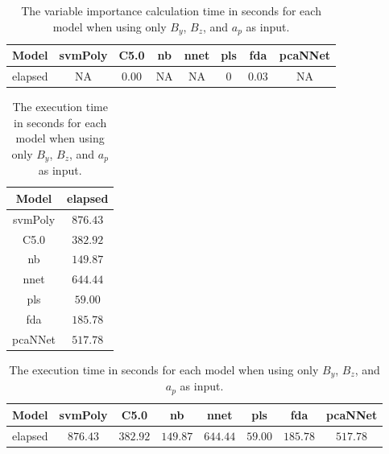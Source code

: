 \begin{table}[!ht]
	\centering
	\begin{tabular}{|c|c|c|c|c|c|c|c|}
		\hline
		Model & svmPoly & C5.0 & nb & nnet & pls & fda & pcaNNet \\ \hline
		elapsed & NA & $0.00$ & NA & NA & $0$ & $0.03$ & NA \\ \hline
	\end{tabular}
	\caption{The variable importance calculation time in seconds for each model when using only $B_{y}$, $B_{z}$, and $a_{p}$ as input.}
	\label{tab:time:reverse:yzap:importance}
\end{table}

\begin{table}[!ht]
	\centering
	\begin{tabular}{|c|c|}
		\hline
		Model & elapsed \\ \hline
		svmPoly & $876.43$ \\ \hline
		C5.0 & $382.92$ \\ \hline
		nb & $149.87$ \\ \hline
		nnet & $644.44$ \\ \hline
		pls & $59.00$ \\ \hline
		fda & $185.78$ \\ \hline
		pcaNNet & $517.78$ \\ \hline
	\end{tabular}
	\caption{The execution time in seconds for each model when using only $B_{y}$, $B_{z}$, and $a_{p}$ as input.}
	\label{tab:time:yzap:total}
\end{table}

\begin{table}[!ht]
	\centering
	\begin{tabular}{|c|c|c|c|c|c|c|c|}
		\hline
		Model & svmPoly & C5.0 & nb & nnet & pls & fda & pcaNNet \\ \hline
		elapsed & $876.43$ & $382.92$ & $149.87$ & $644.44$ & $59.00$ & $185.78$ & $517.78$ \\ \hline
	\end{tabular}
	\caption{The execution time in seconds for each model when using only $B_{y}$, $B_{z}$, and $a_{p}$ as input.}
	\label{tab:time:reverse:yzap:total}
\end{table}

